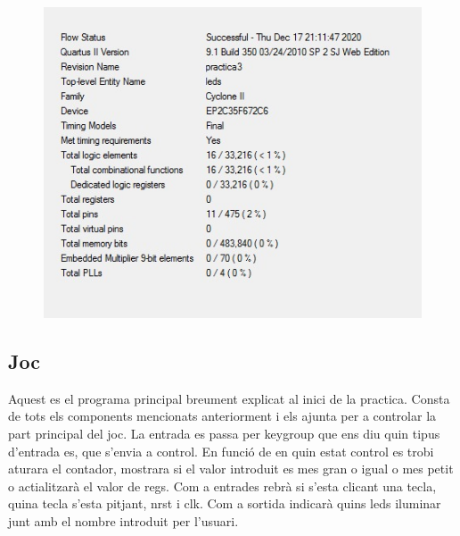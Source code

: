 \documentclass[12pt, a4papre]{article}
\begin{document}
		
			\begin{figure}[H]
		\begin{center}
		\includegraphics[width=130mm]{informeLeds1.jpeg}
		\end{center}
	\end{figure}
	
	\subsection{Joc}
	Aquest es el programa principal breument explicat al inici de la practica. Consta de tots els components mencionats anteriorment i els ajunta per a controlar la part principal del joc. La entrada es passa per keygroup que ens diu quin tipus d'entrada es, que s'envia a control. En funció de en quin estat control es trobi aturara el contador, mostrara si el valor introduit es mes gran o igual o mes petit o actialitzarà el valor de regs. Com a entrades rebrà si s'esta clicant una tecla, quina tecla s'esta pitjant, nrst i clk. Com a sortida indicarà quins leds iluminar junt amb el nombre introduit per l'usuari.
	
\end{document}
